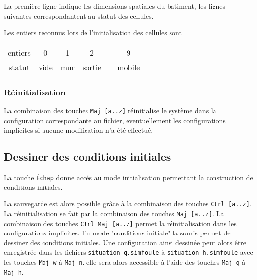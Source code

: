 La première ligne indique les dimensions spatiales du batiment, les lignes suivantes correspondantent au statut des cellules.

Les entiers reconnus lors de l'initialisation des cellules sont

\begin{center}
\begin{tabular}{cccccc}
entiers & 0 & 1 & 2 &  & 9 \\
statut & vide & mur & sortie &  & mobile \\
\end{tabular}
\end{center}
%
\subsubsection{Réinitialisation}
La combinaison des touches \texttt{Maj [a..z]} réinitialise le système dans la configuration correspondante au fichier, eventuellement les configurations implicites si aucune modification n'a été effectué.
%
\subsection{Dessiner des conditions initiales}
La touche \texttt{Échap} donne accés au mode initialisation permettant la construction de conditions initiales.

La sauvegarde est alors possible grâce à la combinaison des touches \texttt{Ctrl [a..z]}. La réinitialisation se fait par la combinaison des touches \texttt{Maj [a..z]}. La combinaison des touches \texttt{Ctrl Maj [a..z]} permet la réinitialisation dans les configurations implicites.
En mode "conditions initiale" la souris permet de dessiner des conditions initiales. Une configuration ainsi dessinée peut alors être enregistrée dans les fichiers \texttt{situation\_q.simfoule} à \texttt{situation\_h.simfoule} avec les touches \texttt{Maj-w} à \texttt{Maj-n}. elle sera alors accessible à l'aide des touches \texttt{Maj-q} à \texttt{Maj-h}.











